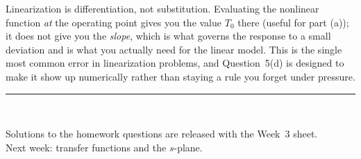 \documentclass[11pt,a4paper]{article}
\newif\ifsolutions
\begin{document}
\begin{pitfall}
Linearization is differentiation, not substitution. Evaluating the nonlinear
function \emph{at} the operating point gives you the value $T_0$ there (useful
for part (a)); it does not give you the \emph{slope}, which is what governs
the response to a small deviation and is what you actually need for the linear
model. This is the single most common error in linearization problems,
and Question~5(d) is designed to make it show up numerically rather than
staying a rule you forget under pressure.
\end{pitfall}

\vfill
\begin{center}
\rule{0.5\textwidth}{0.4pt}\\[4pt]
{\small\itshape
\ifsolutions
  End of solutions. Week~3: transfer functions and the $s$-plane.
\else
  Solutions to the homework questions are released with the Week~3 sheet.\\
  Next week: transfer functions and the $s$-plane.
\fi}
\end{center}
\end{document}
